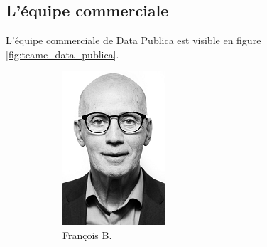     \subsection{L'équipe commerciale}
    \label{annexe:teamc_data_publica}
        L'équipe commerciale de Data Publica est visible en figure \ref{fig:teamc_data_publica}.
        \begin{figure}[h!]
            \centering
            \begin{subfigure}[b]{0.2\textwidth}
                \includegraphics[width=\textwidth]{images/francois-serieux.png}
                \caption{François B.}
                \label{fig:francois}
            \end{subfigure}
            \begin{subfigure}[b]{0.2\textwidth}

\end{subfigure}
\end{figure}
